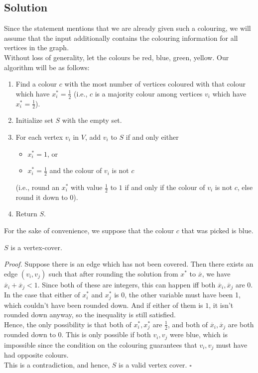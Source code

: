 \documentclass[a4paper]{article}
\newenvironment{proof}{\begin{breakbox}\textit{Proof.}}{\hfill$\square$\end{breakbox}}
\newcommand{\nl}{\vspace{0.2cm}\\}
\begin{document}
\subsection{Solution}

Since the statement mentions that we are already given such a colouring, we will assume that the input additionally contains the colouring information for all vertices in the graph.\nl
Without loss of generality, let the colours be red, blue, green, yellow. Our algorithm will be as follows:

\begin{enumerate}
    \item Find a colour $c$ with the most number of vertices coloured with that colour which have $x_i^* = \frac{1}{2}$ (i.e., $c$ is a majority colour among vertices $v_i$ which have $x_i^* =
        \frac{1}{2}$).
    \item Initialize set $S$ with the empty set.
    \item For each vertex $v_i$ in $V$, add $v_i$ to $S$ if and only either
        \begin{itemize}
            \item $x_i^* = 1$, or
            \item $x_i^* = \frac{1}{2}$ and the colour of $v_i$ is not $c$
        \end{itemize}
        (i.e., round an $x_i^*$ with value $\frac{1}{2}$ to $1$ if and only if the colour of $v_i$ is not $c$, else round it down to $0$).
    \item Return $S$.
\end{enumerate}

For the sake of convenience, we suppose that the colour $c$ that was picked is blue.\nl

\begin{claim}
    $S$ is a vertex-cover.
\end{claim}

\begin{proof}
    Suppose there is an edge which has not been covered. Then there exists an edge $(v_i, v_j)$ such that after rounding the solution from $x^*$ to $\overline{x}$, we have $\overline{x}_i +
    \overline{x}_j
    < 1$. Since both of these are integers, this can happen iff both $\overline{x}_i, \overline{x}_j$ are 0. In the case that either of $x^*_i$ and $x^*_j$ is $0$, the other variable must have been
    1, which couldn't have been rounded down. And if either of them is $1$, it isn't rounded down anyway, so the inequality is still satisfied.\nl
    Hence, the only possibility is that both of $x^*_i, x^*_j$ are $\frac{1}{2}$, and both of $\overline{x}_i, \overline{x}_j$ are both rounded down to $0$. This is only possible if both $v_i,
    v_j$
    were blue, which is impossible since the condition on the colouring guarantees that $v_i, v_j$ must have had opposite colours.\nl
    This is a contradiction, and hence, $S$ is a valid vertex cover.
\end{proof}
\end{document}
